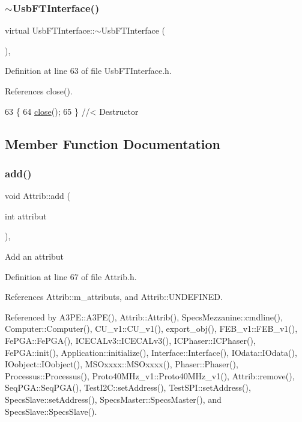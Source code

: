 \subsubsection{\texorpdfstring{$\sim$\+Usb\+F\+T\+Interface()}{~UsbFTInterface()}}
{\footnotesize\ttfamily virtual Usb\+F\+T\+Interface\+::$\sim$\+Usb\+F\+T\+Interface (\begin{DoxyParamCaption}{ }\end{DoxyParamCaption})\hspace{0.3cm}{\ttfamily [inline]}, {\ttfamily [virtual]}}



Definition at line 63 of file Usb\+F\+T\+Interface.\+h.



References close().


\begin{DoxyCode}
63                             \{
64     \hyperlink{classUsbFTInterface_ad555e20eb4b80da1d3cac5a8c6509bb5}{close}();
65   \} \textcolor{comment}{//< Destructor}
\end{DoxyCode}


\subsection{Member Function Documentation}
\mbox{\label{classAttrib_a235f773af19c900264a190b00a3b4ad7}} 
\subsubsection{\texorpdfstring{add()}{add()}}
{\footnotesize\ttfamily void Attrib\+::add (\begin{DoxyParamCaption}\item[{int}]{attribut }\end{DoxyParamCaption})\hspace{0.3cm}{\ttfamily [inline]}, {\ttfamily [inherited]}}

Add an attribut 

Definition at line 67 of file Attrib.\+h.



References Attrib\+::m\+\_\+attributs, and Attrib\+::\+U\+N\+D\+E\+F\+I\+N\+ED.



Referenced by A3\+P\+E\+::\+A3\+P\+E(), Attrib\+::\+Attrib(), Specs\+Mezzanine\+::cmdline(), Computer\+::\+Computer(), C\+U\+\_\+v1\+::\+C\+U\+\_\+v1(), export\+\_\+obj(), F\+E\+B\+\_\+v1\+::\+F\+E\+B\+\_\+v1(), Fe\+P\+G\+A\+::\+Fe\+P\+G\+A(), I\+C\+E\+C\+A\+Lv3\+::\+I\+C\+E\+C\+A\+Lv3(), I\+C\+Phaser\+::\+I\+C\+Phaser(), Fe\+P\+G\+A\+::init(), Application\+::initialize(), Interface\+::\+Interface(), I\+Odata\+::\+I\+Odata(), I\+Oobject\+::\+I\+Oobject(), M\+S\+Oxxxx\+::\+M\+S\+Oxxxx(), Phaser\+::\+Phaser(), Processus\+::\+Processus(), Proto40\+M\+Hz\+\_\+v1\+::\+Proto40\+M\+Hz\+\_\+v1(), Attrib\+::remove(), Seq\+P\+G\+A\+::\+Seq\+P\+G\+A(), Test\+I2\+C\+::set\+Address(), Test\+S\+P\+I\+::set\+Address(), Specs\+Slave\+::set\+Address(), Specs\+Master\+::\+Specs\+Master(), and Specs\+Slave\+::\+Specs\+Slave().


